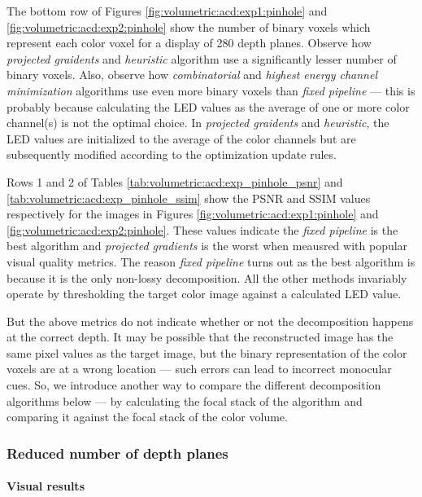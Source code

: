 The bottom row of Figures \ref{fig:volumetric:acd:exp1:pinhole} and \ref{fig:volumetric:acd:exp2:pinhole} show the number of binary voxels which represent each color voxel for a display of 280 depth planes. Observe how \emph{projected graidents} and \emph{heuristic} algorithm use a significantly lesser number of binary voxels. Also, observe how \emph{combinatorial} and \emph{highest energy channel minimization} algorithms use even more binary voxels than \emph{fixed pipeline} --- this is probably because calculating the LED values as the average of one or more color channel(s) is not the optimal choice. In \emph{projected graidents} and \emph{heuristic}, the LED values are initialized to the average of the color channels but are subsequently modified according to the optimization update rules. 

Rows 1 and 2 of Tables \ref{tab:volumetric:acd:exp_pinhole_psnr} and \ref{tab:volumetric:acd:exp_pinhole_ssim} show the PSNR and SSIM values respectively for the images in Figures \ref{fig:volumetric:acd:exp1:pinhole} and \ref{fig:volumetric:acd:exp2:pinhole}. These values indicate the \emph{fixed pipeline} is the best algorithm and \emph{projected gradients} is the worst when meausred with popular visual quality metrics. The reason \emph{fixed pipeline} turns out as the best algorithm is because it is the only non-lossy decomposition. All the other methods invariably operate by thresholding the target color image against a calculated LED value. 

But the above metrics do not indicate whether or not the decomposition happens at the correct depth. It may be possible that the reconstructed image has the same pixel values as the target image, but the binary representation of the color voxels are at a wrong location --- such errors can lead to incorrect monocular cues. So, we introduce another way to compare the different decomposition algorithms below --- by calculating the focal stack of the algorithm and comparing it against the focal stack of the color volume. 

\subsubsection{Reduced number of depth planes}




\paragraph{Visual results}

